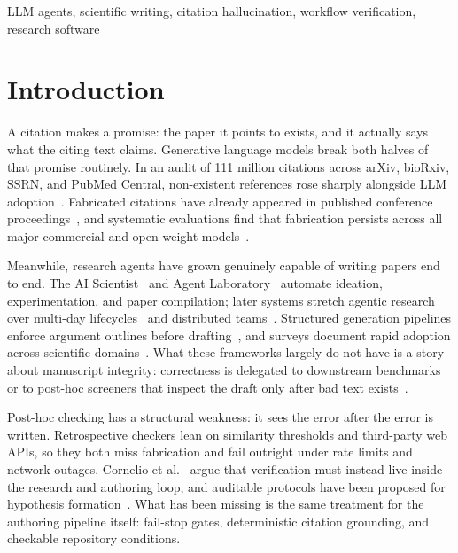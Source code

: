 \documentclass[conference]{IEEEtran}
\begin{document}
\begin{IEEEkeywords}
LLM agents, scientific writing, citation hallucination, workflow verification, research software
\end{IEEEkeywords}

\section{Introduction}

A citation makes a promise: the paper it points to exists, and it actually says what the citing text claims. Generative language models break both halves of that promise routinely. In an audit of 111 million citations across arXiv, bioRxiv, SSRN, and PubMed Central, non-existent references rose sharply alongside LLM adoption~\cite{zhao2026llm}. Fabricated citations have already appeared in published conference proceedings~\cite{russinovich2026phantom}, and systematic evaluations find that fabrication persists across all major commercial and open-weight models~\cite{naser2026how}.

Meanwhile, research agents have grown genuinely capable of writing papers end to end. The AI Scientist~\cite{lu2024the} and Agent Laboratory~\cite{schmidgall2025agent} automate ideation, experimentation, and paper compilation; later systems stretch agentic research over multi-day lifecycles~\cite{zhao2026scienceflow,mitchener2025kosmos} and distributed teams~\cite{tang2026fars,du2025accelerating}. Structured generation pipelines enforce argument outlines before drafting~\cite{qian2026story2proposal}, and surveys document rapid adoption across scientific domains~\cite{ren2025towards,tie2025a,kong2026ai}. What these frameworks largely do not have is a story about manuscript integrity: correctness is delegated to downstream benchmarks~\cite{miyai2026paper} or to post-hoc screeners that inspect the draft only after bad text exists~\cite{rao2026detecting,khajavi2026citecheck}.

Post-hoc checking has a structural weakness: it sees the error after the error is written. Retrospective checkers lean on similarity thresholds and third-party web APIs, so they both miss fabrication and fail outright under rate limits and network outages. Cornelio et al.~\cite{cornelio2025the} argue that verification must instead live inside the research and authoring loop, and auditable protocols have been proposed for hypothesis formation~\cite{takahara2026toward,wang2026firstresearch}. What has been missing is the same treatment for the authoring pipeline itself: fail-stop gates, deterministic citation grounding, and checkable repository conditions.
\end{document}
